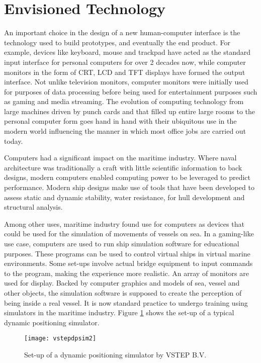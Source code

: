 \section{Envisioned Technology}
\label{sec:envisionedtech}
An important choice in the design of a new human-computer interface is the technology used to build prototypes, and eventually the end product. For example, devices like keyboard, mouse and trackpad have acted as the standard input interface for personal computers for over 2 decades now, while computer monitors in the form of CRT, LCD and TFT displays have formed the output interface. Not unlike television monitors, computer monitors were initially used for purposes of data processing before being used for entertainment purposes such as gaming and media streaming. The evolution of computing technology from large machines driven by punch cards and that filled up entire large rooms to the personal computer form goes hand in hand with their ubiquitous use in the modern world influencing the manner in which most office jobs are carried out today. 

Computers had a significant impact on the maritime industry. Where naval architecture was traditionally a craft with little scientific information to back designs, modern computers enabled computing power to be leveraged to predict performance. Modern ship designs make use of tools that have been developed to assess static and dynamic stability, water resistance, for hull development and structural analysis. 

Among other uses, maritime industry found use for computers as devices that could be used for the simulation of movements of vessels on sea. In a gaming-like use case, computers are used to run ship simulation software for educational purposes. These programs can be used to control virtual ships in virtual marine environments. Some set-ups involve actual bridge equipment to input commands to the program, making the experience more realistic. An array of monitors are used for display. Backed by computer graphics and models of sea, vessel and other objects, the simulation software is supposed to create the perception of being inside a real vessel. It is now standard practice to undergo training using simulators in the maritime industry. Figure \ref{fig:vstepdpsim} shows the set-up of a typical dynamic positioning simulator. 


\begin{figure}
	\centering
	\texttt{[image: vstepdpsim2]}
	\caption{Set-up of a dynamic positioning simulator by VSTEP B.V.}
	\label{fig:vstepdpsim}
\end{figure}



